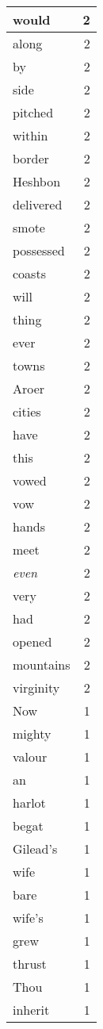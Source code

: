 \begin{center}
\begin{longtable}{l|r}
would & 2\\ \hline 
along & 2\\ \hline 
by & 2\\ \hline 
side & 2\\ \hline 
pitched & 2\\ \hline 
within & 2\\ \hline 
border & 2\\ \hline 
Heshbon & 2\\ \hline 
delivered & 2\\ \hline 
smote & 2\\ \hline 
possessed & 2\\ \hline 
coasts & 2\\ \hline 
will & 2\\ \hline 
thing & 2\\ \hline 
ever & 2\\ \hline 
towns & 2\\ \hline 
Aroer & 2\\ \hline 
cities & 2\\ \hline 
have & 2\\ \hline 
this & 2\\ \hline 
vowed & 2\\ \hline 
vow & 2\\ \hline 
hands & 2\\ \hline 
meet & 2\\ \hline 
\emph{even} & 2\\ \hline 
very & 2\\ \hline 
had & 2\\ \hline 
opened & 2\\ \hline 
mountains & 2\\ \hline 
virginity & 2\\ \hline 
Now & 1\\ \hline 
mighty & 1\\ \hline 
valour & 1\\ \hline 
an & 1\\ \hline 
harlot & 1\\ \hline 
begat & 1\\ \hline 
Gilead's & 1\\ \hline 
wife & 1\\ \hline 
bare & 1\\ \hline 
wife's & 1\\ \hline 
grew & 1\\ \hline 
thrust & 1\\ \hline 
Thou & 1\\ \hline 
inherit & 1\\ \hline 

\end{longtable}
\end{center}
